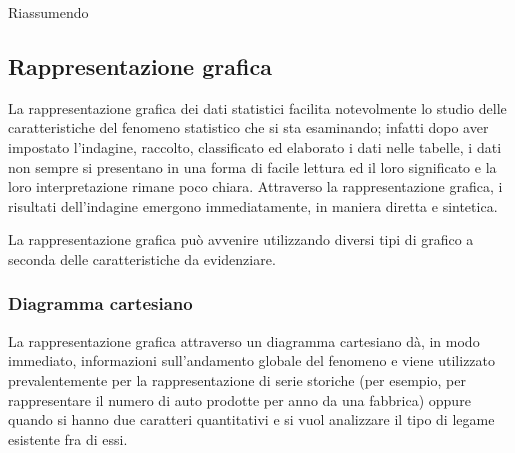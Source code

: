 \pagebreak %

Riassumendo
\begin{center}
 
\end{center}


\subsection{Rappresentazione grafica}
\label{subsec:stat02_rappresentazione}

La rappresentazione grafica dei dati statistici facilita notevolmente lo 
studio delle caratteristiche del
fenomeno statistico che si sta esaminando; infatti dopo aver impostato 
l'indagine, raccolto, classificato ed elaborato i dati nelle tabelle,
i dati non sempre si presentano in una forma di facile lettura ed il loro 
significato e la loro interpretazione rimane poco chiara.
Attraverso la rappresentazione grafica, i risultati dell'indagine emergono 
immediatamente, in maniera diretta e sintetica.

La rappresentazione grafica può avvenire utilizzando diversi tipi di 
grafico a seconda delle caratteristiche da
evidenziare.

\subsubsection{Diagramma cartesiano}
La rappresentazione grafica attraverso un diagramma cartesiano dà, in modo 
immediato, informazioni sull'andamento globale del fenomeno e viene
utilizzato prevalentemente per la rappresentazione di serie storiche (per 
esempio, per rappresentare il numero di auto prodotte per anno da una 
fabbrica)
oppure quando si hanno due caratteri quantitativi e si vuol analizzare il 
tipo di legame esistente fra di essi.

